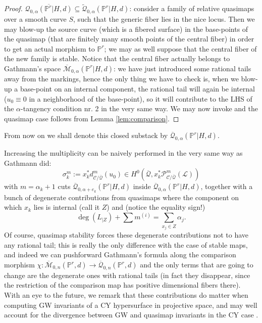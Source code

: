 \documentclass[11pt]{amsart}
\newcommand{\M}[4]{\overline{\mathcal M}_{#1,#2}(#3,#4)}
\newcommand{\Q}[4]{\overline{\mathcal Q}_{#1,#2}(#3,#4)}
\newcommand{\Qt}[4]{\widetilde{\mathcal Q}_{#1,#2}(#3,#4)}
\newcommand{\PP}{\mathbb P}
\renewcommand{\to}{\rightarrow}
\newcommand{\comp}{\chi}
\theoremstyle{plain}
\theoremstyle{definition}
\begin{document}
\begin{proof}
$\overline{\mathcal Q_{0,\alpha}(\PP^r|H,d)}\subseteq\Qt{0}{\alpha}{\PP^r|H}{d}$: consider a family of relative quasimaps over a smooth curve $S$, such that the generic fiber lies in the nice locus. Then we may blow-up the source curve (which is a fibered surface) in the base-points of the quasimap (that are finitely many smooth points of the central fiber) in order to get an actual morphism to $\mathbb P^r$; we may as well suppose that the central fiber of the new family is stable. Notice that the central fiber actually belongs to Gathmann's space $\M{0}{\alpha}{\PP^r|H}{d}$: we have just introduced some rational tails away from the markings, hence the only thing we have to check is, when we blow-up a base-point on an internal component, the rational tail will again be internal ($u_0\equiv 0$ in a neighborhood of the base-point), so it will contribute to the LHS of the $\alpha$-tangency condition nr. 2 in the very same way. We may now invoke \cite[Lemma 1.9]{Ga} and the quasimap case follows from Lemma \ref{lem:comparison}.
\end{proof}
From now on we shall denote this closed substack by $\Q{0}{\alpha}{\PP^r|H}{d}$.

\medskip

Increasing the multiplicity can be naively performed in the very same way as Gathmann did:
\[
\sigma^m_k:=x_k^*d^m_{\mathcal C/\overline{\mathcal Q}}(u_0)\in H^0(\overline{\mathcal Q},x_k^*\mathcal P^m_{\mathcal C/\overline{\mathcal Q}}(\mathcal L))
\]
with $m=\alpha_k+1$ cuts $\Q{0}{\alpha+e_k}{\PP^r|H}{d}$ inside $\Q{0}{\alpha}{\PP^r|H}{d}$, together with a bunch of degenerate contributions from quasimaps where the component on which $x_k$ lies is internal (call it $Z$) and (notice the equality sign!)
\[
\deg(L_{|Z})+\sum m^{(i)}=\sum_{x_j\in Z}\alpha_j.
\]
Of course, quasimap stability forces these degenerate contributions not to have any rational tail; this is really the only difference with the case of stable maps, and indeed we can pushforward Gathmann's formula along the comparison morphism $\comp\colon \M{0}{n}{\PP^r}{d}\to\Q{0}{n}{\PP^r}{d}$ and the only terms that are going to change are the degenerate ones with rational tails (in fact they disappear, since the restriction of the comparison map has positive dimensional fibers there). With an eye to the future, we remark that these contributions do matter when computing GW invariants of a CY hypersurface in projective space, and may well account for the divergence between GW and quasimap invariants in the CY case \cite[Rmk. 1.6]{Ga-MF}.
\end{document}
